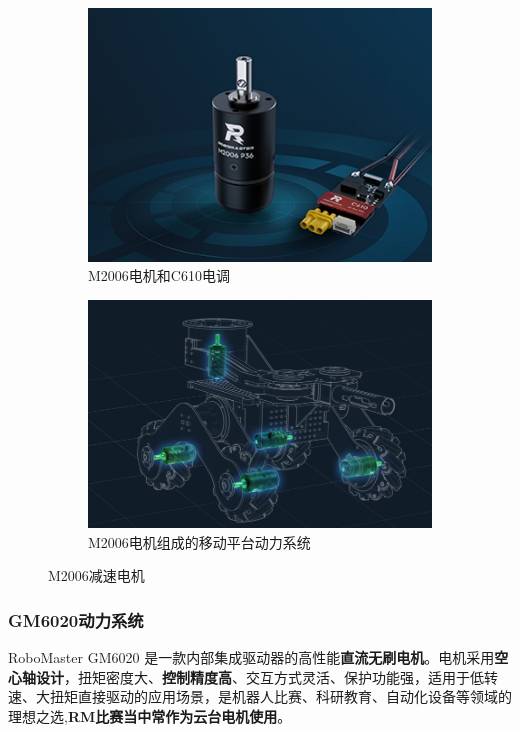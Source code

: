 \documentclass[UTF8]{article} %
\begin{document}
\begin{figure}[H]
  \centering
  \begin{subfigure}[b]{0.35\textwidth}
         \centering
         \includegraphics[width=\textwidth]{dj5.png}
          \caption{M2006电机和C610电调}
  \end{subfigure}
  \quad
  \begin{subfigure}[b]{0.39\textwidth}
          \centering
          \includegraphics[width=\textwidth]{dj6.png}
          \caption{M2006电机组成的移动平台动力系统}
  \end{subfigure}
  \caption{M2006减速电机}
\end{figure}

\subsubsection{GM6020动力系统}
RoboMaster GM6020 是一款内部集成驱动器的高性能\textbf{直流无刷电机}。电机采用\textbf{空心轴设计}，扭矩密度大、\textbf{控制精度高}、交互方式灵活、保护功能强，适用于低转速、大扭矩直接驱动的应用场景，是机器人比赛、科研教育、自动化设备等领域的理想之选,\textbf{RM比赛当中常作为云台电机使用}。
\end{document}
